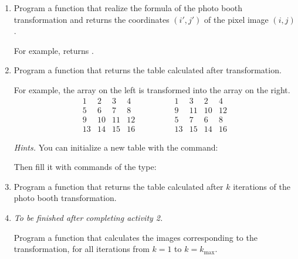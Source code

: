 \documentclass[11pt,class=report,crop=false]{standalone}
\begin{document}
\begin{activite}




\begin{enumerate}
  \item Program a function  that realize the formula of the photo booth transformation and returns the coordinates $(i',j')$ of the pixel image $(i,j)$.
  
  For example,  returns .
  
  \item Program a function  that returns the table calculated after transformation.

For example, the array on the left is transformed into the array on the right.
$$\begin{array}{cccc} 
  1& 2& 3& 4\\ 
  5& 6& 7& 8\\  
  9&10&11&12\\  
 13&14&15&16  
\end{array}\qquad\qquad
\begin{array}{cccc} 
  1& 3& 2& 4\\  
  9&11&10&12\\  
  5& 7& 6& 8\\  
 13&15&14&16
\end{array}$$

  \emph{Hints.} You can initialize a new table with the command:  
  
  Then fill it with commands of the type: 

  \item Program a function  that returns the table calculated after $k$ iterations of the photo booth transformation.
  
  \item \emph{To be finished after completing activity 2.}
  
  Program a function  that calculates the images corresponding to the transformation, for all iterations from $k=1$ to $k=k_{\max}$.
  

\end{enumerate}
\end{activite}
\end{document}
